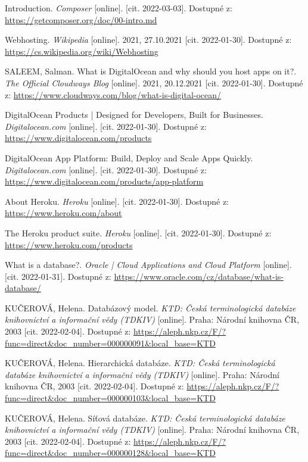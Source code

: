 \begin{thebibliography}{55}
Introduction. \textit{Composer} [online]. [cit. 2022-03-03]. Dostupné z: \url{https://getcomposer.org/doc/00-intro.md}

Webhosting. \textit{Wikipedia} [online]. 2021, 27.10.2021 [cit. 2022-01-30]. Dostupné z: \url{https://cs.wikipedia.org/wiki/Webhosting}

SALEEM, Salman. What is DigitalOcean and why should you host apps on it?. \textit{The Official Cloudways Blog} [online]. 2021, 20.12.2021 [cit. 2022-01-30]. Dostupné z: \url{https://www.cloudways.com/blog/what-is-digital-ocean/}

DigitalOcean Products | Designed for Developers, Built for Businesses. \textit{Digitalocean.com} [online]. [cit. 2022-01-30]. Dostupné z: \url{https://www.digitalocean.com/products}

DigitalOcean App Platform: Build, Deploy and Scale Apps Quickly. \textit{Digitalocean.com} [online]. [cit. 2022-01-30]. Dostupné z: \url{https://www.digitalocean.com/products/app-platform}

About Heroku. \textit{Heroku} [online]. [cit. 2022-01-30]. Dostupné z: \url{https://www.heroku.com/about}

The Heroku product suite. \textit{Heroku} [online]. [cit. 2022-01-30]. Dostupné z: \url{https://www.heroku.com/products}

What is a database?. \textit{Oracle | Cloud Applications and Cloud Platform} [online]. [cit. 2022-01-31]. Dostupné z: \url{https://www.oracle.com/cz/database/what-is-database/}

KUČEROVÁ, Helena. Databázový model. \textit{KTD: Česká terminologická databáze knihovnictví a informační vědy (TDKIV)} [online]. Praha: Národní knihovna ČR, 2003 [cit. 2022-02-04]. Dostupné z: \url{https://aleph.nkp.cz/F/?func=direct&doc\_number=000000091&local\_base=KTD}

KUČEROVÁ, Helena. Hierarchická databáze. \textit{KTD: Česká terminologická databáze knihovnictví a informační vědy (TDKIV)} [online]. Praha: Národní knihovna ČR, 2003 [cit. 2022-02-04]. Dostupné z: \url{https://aleph.nkp.cz/F/?func=direct&doc\_number=000000103&local\_base=KTD}

KUČEROVÁ, Helena. Síťová databáze. \textit{KTD: Česká terminologická databáze knihovnictví a informační vědy (TDKIV)} [online]. Praha: Národní knihovna ČR, 2003 [cit. 2022-02-04]. Dostupné z: \url{https://aleph.nkp.cz/F/?func=direct&doc\_number=000000128&local\_base=KTD}


\end{thebibliography}

